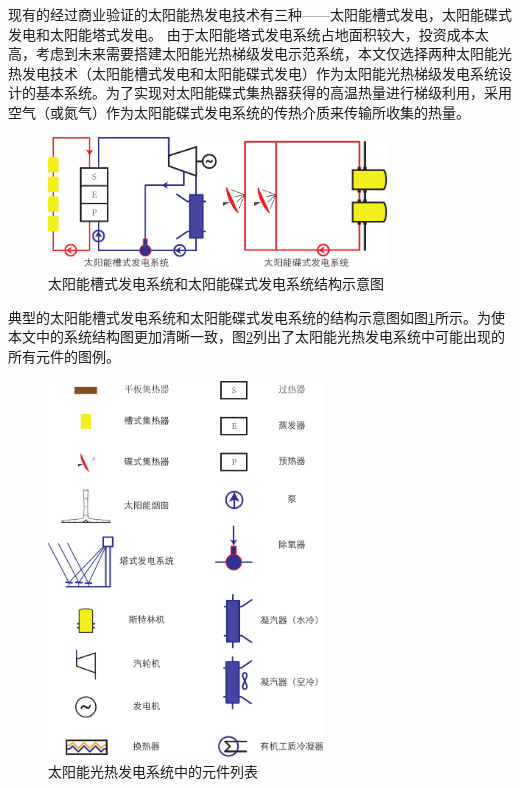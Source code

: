 现有的经过商业验证的太阳能热发电技术有三种——太阳能槽式发电，太阳能碟式发电和太阳能塔式发电。
由于太阳能塔式发电系统占地面积较大，投资成本太高，考虑到未来需要搭建太阳能光热梯级发电示范系统，本文仅选择两种太阳能光热发电技术（太阳能槽式发电和太阳能碟式发电）作为太阳能光热梯级发电系统设计的基本系统。为了实现对太阳能碟式集热器获得的高温热量进行梯级利用，采用空气（或氮气）作为太阳能碟式发电系统的传热介质来传输所收集的热量。
\begin{figure}[!ht]
\centering
\includegraphics[width=0.8\textwidth]{fig/PTPD.pdf}
\caption{太阳能槽式发电系统和太阳能碟式发电系统结构示意图}
\label{fig:PTPD}
\end{figure}
典型的太阳能槽式发电系统和太阳能碟式发电系统的结构示意图如图\ref{fig:PTPD}所示。为使本文中的系统结构图更加清晰一致，图\ref{fig:Legends}列出了太阳能光热发电系统中可能出现的所有元件的图例。
\begin{figure}[!ht]
\centering
\includegraphics[width=0.65\textwidth]{fig/Legends.pdf}
\caption{太阳能光热发电系统中的元件列表}
\label{fig:Legends}
\end{figure}

